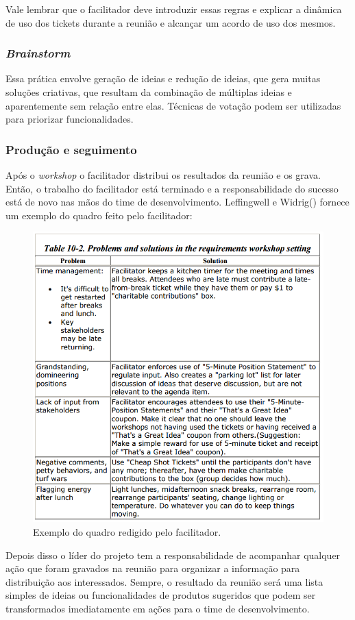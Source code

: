 	Vale lembrar que o facilitador deve introduzir essas regras e explicar a 
	dinâmica de uso dos tickets durante a reunião e alcançar um acordo de uso dos mesmos.
	
      \subsubsection{\textit{Brainstorm}}
	
	Essa prática envolve geração de ideias e redução de ideias, que gera muitas soluções criativas, 
	que resultam da combinação de múltiplas ideias e aparentemente sem relação entre elas. 
	Técnicas de votação podem ser utilizadas para priorizar funcionalidades.
      
      \subsubsection{Produção e seguimento}
      
	Após o \textit{workshop} o facilitador distribui os resultados da reunião e os grava. 
	Então, o trabalho do facilitador está terminado e a responsabilidade do sucesso está de novo nas mãos do time de desenvolvimento. 
	Leffingwell e Widrig(\citeyear{leffingwell99}) fornece um exemplo do quadro feito pelo facilitador:
	
	\begin{figure}[!htbp]
	  \centering
	  \includegraphics[scale=0.25]{editaveis/figuras/problems_solutions}
	  \caption[Exemplo do quadro redigido pelo facilitador]
	    {Exemplo do quadro redigido pelo facilitador.\footnotemark}
	  \label{problems_solutions}
	\end{figure}
	
	Depois disso o líder do projeto tem a responsabilidade de acompanhar qualquer ação que foram gravados 
	na reunião para organizar a informação para distribuição aos interessados. 
	Sempre, o resultado da reunião será uma lista simples de ideias ou funcionalidades de produtos 
	sugeridos que podem ser transformados imediatamente em ações para o time de desenvolvimento.